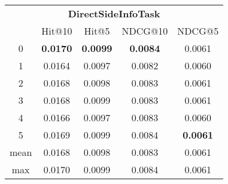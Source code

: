 \documentclass{article}
\begin{document}
 

\begin{tabular}{c|cccc}

\multicolumn{5}{c}{\textbf{DirectSideInfoTask}} \\
\noalign{\smallskip}
\noalign{\smallskip}
\toprule
\multicolumn{1}{c}{Template ID}	&	\multicolumn{1}{|c}{Hit@10}	&	\multicolumn{1}{c}{Hit@5}	&	\multicolumn{1}{c}{NDCG@10}	&	\multicolumn{1}{c}{NDCG@5}\\
\midrule
0	&	\textbf{0.0170}	&	\textbf{0.0099}	&	\textbf{0.0084}	&	0.0061\\
1	&	0.0164	&	0.0097	&	0.0082	&	0.0060\\
2	&	0.0168	&	0.0098	&	0.0083	&	0.0061\\
3	&	0.0168	&	0.0099	&	0.0083	&	0.0061\\
4	&	0.0166	&	0.0097	&	0.0083	&	0.0060\\
5	&	0.0169	&	0.0099	&	0.0084	&	\textbf{0.0061}\\
\midrule
mean	&	0.0168	&	0.0098	&	0.0083	&	0.0061\\
max	&	0.0170	&	0.0099	&	0.0084	&	0.0061\\
\bottomrule

\end{tabular}
\end{document}
